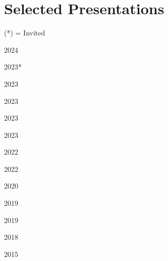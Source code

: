 \documentclass[12pt,letterpaper]{report}
\begin{document}

    \section*{Selected Presentations}
    \small{(*) = Invited} \\

    \begin{tablist}
        \item[2024] \tab{}
        \item[2023*] \tab{}
        \item[2023] \tab{}
        \item[2023] \tab{}
        \item[2023] \tab{}
        \item[2023] \tab{}
        \item[2022] \tab{}
        \item[2022] \tab{}
        \item[2020] \tab{}
        \item[2019] \tab{}
        \item[2019] \tab{}
        \item[2018] \tab{}
        \item[2015] \tab{}
    \end{tablist}


    
    
\end{document}
